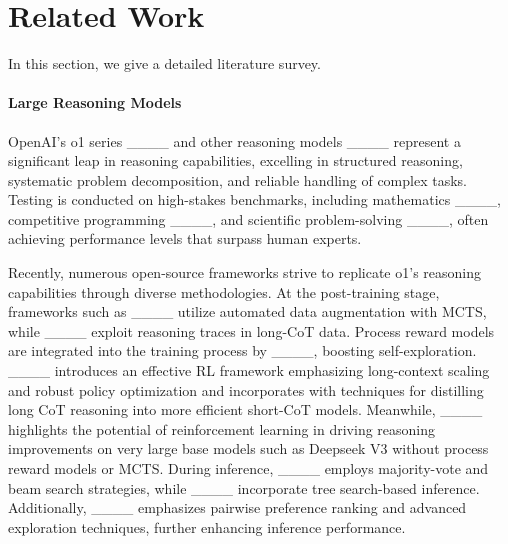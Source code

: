 \section{Related Work}
\label{sec:related-work}

In this section, we give a detailed literature survey.

\paragraph{Large Reasoning Models}
OpenAI’s o1 series ____ and other reasoning models ____ represent a significant leap in reasoning capabilities, excelling in structured reasoning, systematic problem decomposition, and reliable handling of complex tasks. 
Testing is conducted on high-stakes benchmarks, including mathematics ____, competitive programming ____, and scientific problem-solving ____, often achieving performance levels that surpass human experts.

Recently, numerous open-source frameworks strive to replicate o1’s reasoning capabilities through diverse methodologies. At the post-training stage, frameworks such as ____ utilize automated data augmentation with MCTS, while ____ exploit reasoning traces in long-CoT data. Process reward models are integrated into the training process by ____, boosting self-exploration. 
____ introduces an effective RL framework emphasizing long-context scaling and robust policy optimization and incorporates with techniques for distilling long CoT reasoning into more efficient short-CoT models.
Meanwhile, ____ highlights the potential of reinforcement learning in driving reasoning improvements on very large base models such as Deepseek V3 without process reward models or MCTS.
During inference, ____ employs majority-vote and beam search strategies, while ____ incorporate tree search-based inference. Additionally, ____ emphasizes pairwise preference ranking and advanced exploration techniques, further enhancing inference performance.



